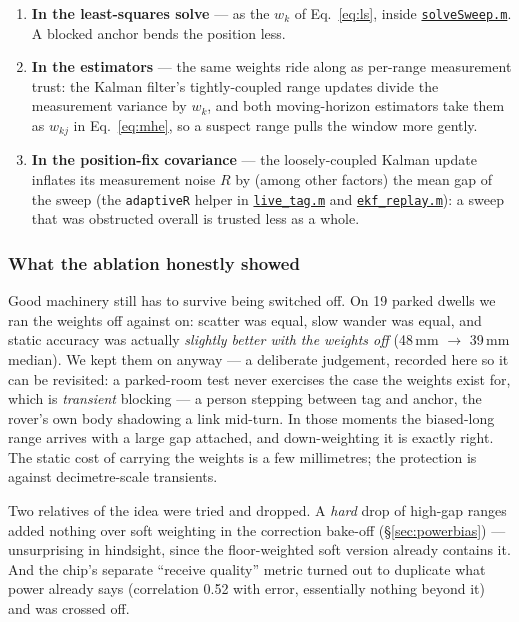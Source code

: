 \documentclass[11pt,a4paper]{article}
\newcommand{\gh}[2]{\href{https://github.com/AdershM-2/UWB_3/blob/main/#1}{\texttt{#2}}}
\newcommand{\code}[1]{\texttt{#1}}
\begin{document}
\begin{enumerate}
\item \textbf{In the least-squares solve} --- as the $w_k$ of
      Eq.~\eqref{eq:ls}, inside \gh{matlab/+dune/solveSweep.m}{solveSweep.m}.
      A blocked anchor bends the position less.
\item \textbf{In the estimators} --- the same weights ride along as per-range
      measurement trust: the Kalman filter's tightly-coupled range updates divide
      the measurement variance by $w_k$, and both moving-horizon estimators take
      them as $w_{kj}$ in Eq.~\eqref{eq:mhe}, so a suspect range pulls the window
      more gently.
\item \textbf{In the position-fix covariance} --- the loosely-coupled Kalman
      update inflates its measurement noise $R$ by (among other factors) the mean
      gap of the sweep (the \code{adaptiveR} helper in
      \gh{matlab/scripts/live\_tag.m}{live\_tag.m} and
      \gh{matlab/scripts/ekf\_replay.m}{ekf\_replay.m}): a sweep that was
      obstructed overall is trusted less as a whole.
\end{enumerate}

\subsubsection{What the ablation honestly showed}

Good machinery still has to survive being switched off. On 19 parked dwells we ran
the weights off against on: scatter was equal, slow wander was equal, and static
accuracy was actually \emph{slightly better with the weights off} (48\,mm
$\to$ 39\,mm median). We kept them on anyway --- a deliberate judgement, recorded
here so it can be revisited: a parked-room test never exercises the case the
weights exist for, which is \emph{transient} blocking --- a person stepping between
tag and anchor, the rover's own body shadowing a link mid-turn. In those moments
the biased-long range arrives with a large gap attached, and down-weighting it is
exactly right. The static cost of carrying the weights is a few millimetres; the
protection is against decimetre-scale transients.

Two relatives of the idea were tried and dropped. A \emph{hard} drop of
high-gap ranges added nothing over soft weighting in the correction bake-off
(\S\ref{sec:powerbias}) --- unsurprising in hindsight, since the floor-weighted
soft version already contains it. And the chip's separate ``receive quality''
metric turned out to duplicate what power already says (correlation 0.52 with
error, essentially nothing beyond it) and was crossed off.
\end{document}
